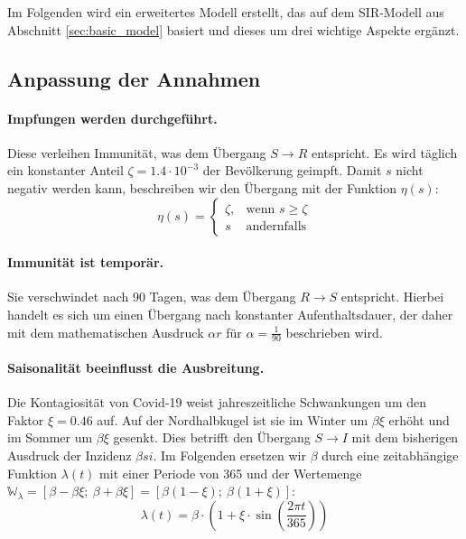 \documentclass[../main.tex]{subfiles}
\begin{document}
    Im Folgenden wird ein erweitertes Modell erstellt, das auf dem SIR-Modell aus Abschnitt \ref{sec:basic_model} basiert und dieses um drei wichtige Aspekte ergänzt.

    \subsection{Anpassung der Annahmen}
    \label{ssec:assumptions2}
    \paragraph{Impfungen werden durchgeführt.} 
    Diese verleihen Immunität, was dem Übergang $S \to R$ entspricht. Es wird täglich ein konstanter Anteil $\zeta = 1.4 \cdot 10^{-3}$ der Bevölkerung geimpft. Damit $s$ nicht negativ werden kann, beschreiben wir den Übergang  mit der Funktion $\eta(s)$:
    \begin{equation}
        \eta(s) = 
        \begin{cases}
            \zeta, &\text{wenn } s \geq \zeta \\
            s      &\text{andernfalls}
        \end{cases}
    \end{equation}

    \paragraph{Immunität ist temporär.} 
    Sie verschwindet nach 90 Tagen, was dem Übergang $R \to S$ entspricht. Hierbei handelt es sich um einen Übergang nach konstanter Aufenthaltsdauer, der daher mit dem mathematischen Ausdruck $\alpha r$ für $\alpha = \frac{1}{90}$ beschrieben wird.

    \paragraph{Saisonalität beeinflusst die Ausbreitung.} 
    Die Kontagiosität von Covid-19 weist jahreszeitliche Schwankungen um den Faktor $\xi = 0.46$ auf. Auf der Nordhalbkugel ist sie im Winter um $\beta \xi$ erhöht und im Sommer um $\beta \xi$ gesenkt. Dies betrifft den Übergang $S \to I$ mit dem bisherigen Ausdruck der Inzidenz $\beta s i$. Im Folgenden ersetzen wir $\beta$ durch eine zeitabhängige Funktion $\lambda(t)$ mit einer Periode von 365 und der Wertemenge $\mathbb{W}_\lambda = [\beta - \beta \xi;\ \beta + \beta \xi] =  [\beta(1-\xi);\ \beta(1+\xi)]$:
    \begin{equation}
        \lambda(t) = \beta \cdot \left(1 + \xi \cdot \sin \left(\frac{2\pi t}{365}\right) \right)
    \end{equation}
\end{document}
